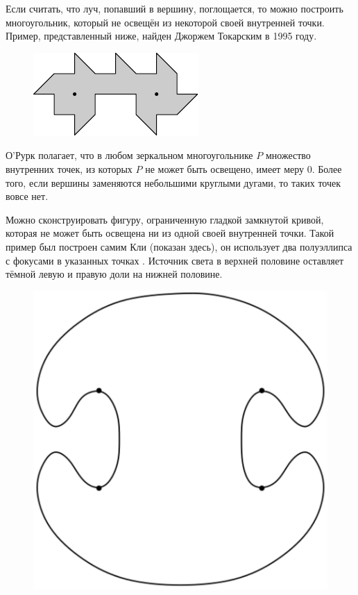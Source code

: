 \documentclass[twoside]{book}
\begin{document}
Если считать, что луч, попавший в вершину, поглощается, то можно построить многоугольник, который не освещён из некоторой своей внутренней точки.
Пример, представленный ниже, найден Джоржем Токарским в 1995 году.

\begin{figure}[!ht]
\centering
\includegraphics{mp/wink-31}
\end{figure} 

О’Рурк полагает, что в любом зеркальном многоугольнике $P$ множество внутренних точек, из которых $P$ не может быть освещено, имеет меру 0.
Более того, если вершины заменяются небольшими круглыми дугами, то таких точек вовсе нет.


Можно сконструировать фигуру, ограниченную гладкой замкнутой кривой, которая не может быть освещена ни из одной своей внутренней точки. 
Такой пример был построен самим Кли (показан здесь), он использует два полуэллипса с фокусами в указанных точках%
.
Источник света в верхней половине оставляет тёмной левую и правую доли на нижней половине.


\begin{figure}[!ht]
\centering
\includegraphics[scale=0.5]{Figs/UnsolvedPuzzles/klee}
\end{figure} 
\end{document}
